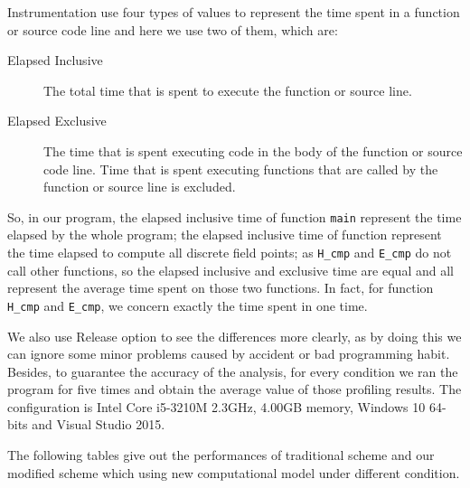 Instrumentation use four types of values to represent the time spent in a function or source code line and here we use two of them, which are:
\begin{description}
	\item[Elapsed Inclusive]\quad The total time that is spent to execute the function or source line.
	\item[Elapsed Exclusive]\quad The time that is spent executing code in the body of the function or source code line. Time that is spent executing functions that are called by the function or source line is excluded.%
\end{description}

So, in our program, the elapsed inclusive time of function \lstinline|main| represent the time elapsed by the whole program; the elapsed inclusive time of function  represent the time elapsed to compute all discrete field points; as \lstinline|H_cmp| and \lstinline|E_cmp| do not call other functions, so the elapsed inclusive and exclusive time are equal and all represent the average time spent on those two functions. In fact, for function \lstinline|H_cmp| and \lstinline|E_cmp|, we concern exactly the time spent in one time.

We also use Release option to see the differences more clearly, as by doing this we can ignore some minor problems caused by accident or bad programming habit. Besides, to guarantee the accuracy of the analysis, for every condition we ran the program for five times and obtain the average value of those profiling results. The configuration is Intel Core i5-3210M 2.3GHz, 4.00GB memory, Windows 10 64-bits and Visual Studio 2015.

The following tables give out the performances of traditional scheme and our modified scheme which using new computational model under different condition.

